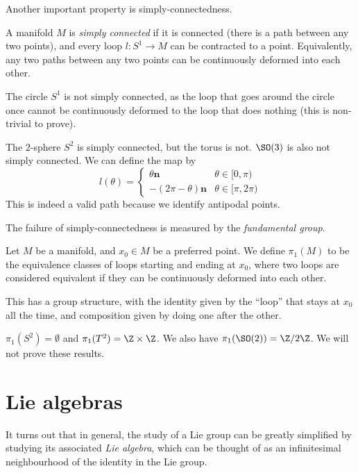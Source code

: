 \documentclass[a4paper]{article}
\begin{document}
Another important property is simply-connectedness.
\begin{defi}
  A manifold $M$ is \emph{simply connected} if it is connected (there is a path between any two points), and every loop $l: S^1 \to M$ can be contracted to a point. Equivalently, any two paths between any two points can be continuously deformed into each other.
\end{defi}

\begin{eg}
  The circle $S^1$ is not simply connected, as the loop that goes around the circle once cannot be continuously deformed to the loop that does nothing (this is non-trivial to prove).
\end{eg}

\begin{eg}
  The $2$-sphere $S^2$ is simply connected, but the torus is not. $\SO(3)$ is also not simply connected. We can define the map by
  \[
    l(\theta) =
    \begin{cases}
      \theta \mathbf{n} & \theta \in [0, \pi)\\
      -(2\pi - \theta) \mathbf{n} & \theta \in [\pi, 2\pi)
    \end{cases}
  \]
  This is indeed a valid path because we identify antipodal points.
\end{eg}

The failure of simply-connectedness is measured by the \emph{fundamental group}.
\begin{defi}
  Let $M$ be a manifold, and $x_0 \in M$ be a preferred point. We define $\pi_1(M)$ to be the equivalence classes of loops starting and ending at $x_0$, where two loops are considered equivalent if they can be continuously deformed into each other.

  This has a group structure, with the identity given by the ``loop'' that stays at $x_0$ all the time, and composition given by doing one after the other.
\end{defi}

\begin{eg}
  $\pi_1(S^2) = \emptyset$ and $\pi_1(T^2) = \Z \times \Z$. We also have $\pi_1(\SO(2)) = \Z/2\Z$. We will not prove these results.
\end{eg}


\section{Lie algebras}
It turns out that in general, the study of a Lie group can be greatly simplified by studying its associated \emph{Lie algebra}, which can be thought of as an infinitesimal neighbourhood of the identity in the Lie group.
\end{document}
